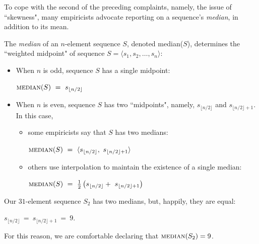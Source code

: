 \bigskip

To cope with the second of the preceding complaints, namely, the issue of ``skewness", many empiricists advocate reporting on a sequence's {\it median}, in addition to its mean.

\smallskip

\noindent
The {\em median} of an $n$-element sequence $S$, denoted {\sc median}($S$), determines 
the ``weighted midpoint" of sequence $S = \langle s_1, s_2, \ldots, s_n \rangle$:

\smallskip

\begin{itemize}
\item
When $n$ is odd, sequence $S$ has a single midpoint:

\smallskip

\hspace*{.35in}
$\mbox{\sc median}(S)  \ = \ s_{\lfloor n/2 \rfloor}$

\item
When $n$ is even, sequence $S$ has two ``midpoints", namely, $s_{\lfloor n/2 \rfloor}$
and $s_{\lfloor n/2 \rfloor +1}$.  In this case,
  \begin{itemize}
  \item
some empiricists say that $S$ has two medians:

\smallskip

\hspace*{.35in}
$\mbox{\sc median}(S)  \ = \ \langle s_{\lfloor n/2 \rfloor}, \ s_{\lfloor n/2 \rfloor +1} \rangle$

  \item
others use interpolation to maintain the existence of a single median:

\smallskip

\hspace*{.35in}
$\mbox{\sc median}(S)  \ = \ {1 \over 2} \left(s_{\lfloor n/2 \rfloor} + \ s_{\lfloor n/2 \rfloor +1} \right)$
  \end{itemize}
\end{itemize}
Our $31$-element sequence $S_2$ has two medians, but, happily, they are equal:

\smallskip

\hspace*{.35in}
$s_{\lfloor n/2 \rfloor} \ = \ s_{\lfloor n/2 \rfloor +1} \ = \ 9$.  

\smallskip

\noindent
For this reason, we are comfortable declaring that $\mbox{\sc median}(S_2) = 9$.

